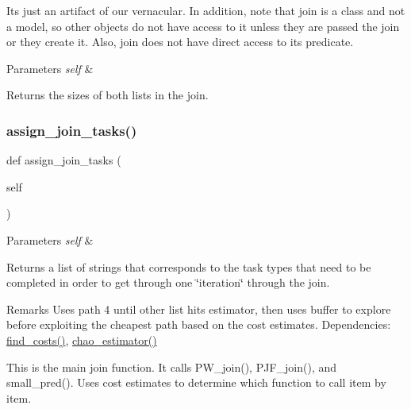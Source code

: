 It\textquotesingle{}s just an artifact of our vernacular. In addition, note that join is a class and not a model, so other objects do not have access to it unless they are passed the join or they create it. Also, join does not have direct access to its predicate. 
\begin{DoxyParams}{Parameters}
{\em self} & \\
\hline
\end{DoxyParams}
\begin{DoxyReturn}{Returns}
the sizes of both lists in the join. 
\end{DoxyReturn}
\mbox{\label{classdynamicfilterapp_1_1models_1_1_join_ad567a4773f2c57ad19df7e88ba5dc774}} 
\subsubsection{\texorpdfstring{assign\_join\_tasks()}{assign\_join\_tasks()}}
{\footnotesize\ttfamily def assign\+\_\+join\+\_\+tasks (\begin{DoxyParamCaption}\item[{}]{self }\end{DoxyParamCaption})}


\begin{DoxyParams}{Parameters}
{\em self} & \\
\hline
\end{DoxyParams}
\begin{DoxyReturn}{Returns}
a list of strings that corresponds to the task types that need to be completed in order to get through one \char`\"{}iteration\char`\"{} through the join. 
\end{DoxyReturn}
\begin{DoxyRemark}{Remarks}
Uses path 4 until other list hits estimator, then uses buffer to explore before exploiting the cheapest path based on the cost estimates. Dependencies\+: \mbox{\hyperlink{classdynamicfilterapp_1_1models_1_1_join_ac9cef0d40608117205ed9d5118f5f87c}{find\+\_\+costs()}}, \mbox{\hyperlink{classdynamicfilterapp_1_1models_1_1_join_a582efaf16c8455e890ef61101a863966}{chao\+\_\+estimator()}}\begin{DoxyVerb}This is the main join function. It calls PW_join(), PJF_join(), and small_pred(). Uses 
cost estimates to determine which function to call item by item.\end{DoxyVerb}
 
\end{DoxyRemark}
\mbox{\label{classdynamicfilterapp_1_1models_1_1_join_a582efaf16c8455e890ef61101a863966}} 
